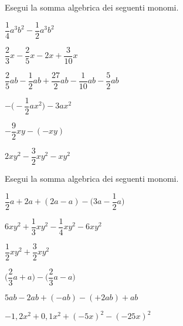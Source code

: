 \begin{esercizio}
 \label{ese:9.29}
Esegui la somma algebrica dei seguenti monomi.
\begin{multicols}{2}
\begin{enumeratea}
\spazielenx
 \item \(\dfrac{1}{4}a^{3}b^{2}-\dfrac{1}{2}a^{3}b^{2}\)
 \item \(\dfrac{2}{3}x-\dfrac{2}{5}x-2x+\dfrac{3}{10}x\)
 \item 
\(\dfrac{2}{5}ab-\dfrac{1}{2}ab+\dfrac{27}{2}ab-\dfrac{1}{10}ab-\dfrac{5}{2}ab\)
 \item \(-\bigg(-{\dfrac{1}{2}}ax^{2}\bigg)-3ax^{2}\)
 \item \(-{\dfrac{9}{2}}xy-(-xy)\)
 \item \(2xy^{2}-\dfrac{3}{2}xy^{2}-xy^{2}\)
\end{enumeratea}
\end{multicols}
\end{esercizio}

\begin{esercizio}
 \label{ese:9.30}
Esegui la somma algebrica dei seguenti monomi.
\begin{multicols}{2}
\begin{enumeratea}
\spazielenx
 \item \(\dfrac{1}{2}a+2a+(2a-a)-\bigg(3a-\dfrac{1}{2}a\bigg)\)
 \item \(6xy^{2}+\dfrac{1}{3}xy^{2}-\dfrac{1}{4}xy^{2}-6xy^{2}\)
 \item \(\dfrac{1}{2}xy^{2}+\dfrac{3}{2}xy^{2}\)
 \item \(\bigg(\dfrac{2}{3}a+a\bigg)-\bigg(\dfrac{2}{3}a-a\bigg)\)
 \item \(5ab-2ab+(-ab)-(+2ab)+ab\)
 \item \(-1,2x^{2}+0,1x^{2}+(-5x)^{2}-(-25x)^{2}\)
\end{enumeratea}
\end{multicols}

\end{esercizio}



